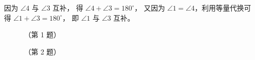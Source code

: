 因为 $\angle 4$ 与 $\angle 3$ 互补， 得 $\angle 4 + \angle 3 = 180^\circ$，
又因为 $\angle 1 = \angle 4$，利用等量代换可得 $\angle 1 + \angle 3 = 180^\circ$，
即 $\angle 1$ 与 $\angle 3$ 互补。


\begin{lianxi}


\begin{figure}[htbp]
    \centering
    \begin{minipage}[b]{7cm}
        \centering
        
        \caption*{（第 1 题）}
    \end{minipage}
    \qquad
    \begin{minipage}[b]{7cm}
        \centering
        
        \caption*{（第 2 题）}
    \end{minipage}
\end{figure}



\end{lianxi}


